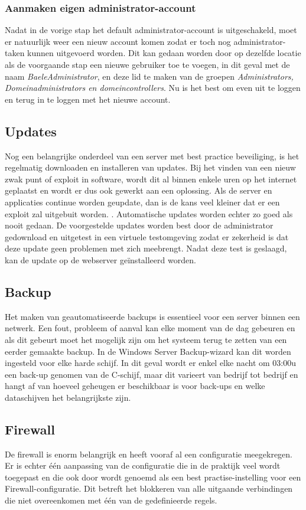 \documentclass[pdftex,a4paper,12pt]{report}
\begin{document}
\subsubsection{Aanmaken eigen administrator-account}
Nadat in de vorige stap het default administrator-account is uitgeschakeld, moet er natuurlijk weer een nieuw account komen zodat er toch nog administrator-taken kunnen uitgevoerd worden. Dit kan gedaan worden door op dezelfde locatie als de voorgaande stap een nieuwe gebruiker toe te voegen, in dit geval met de naam \textit{BaeleAdministrator}, en deze lid te maken van de groepen \textit{Administrators, Domeinadministrators en domeincontrollers}. Nu is het best om even uit te loggen en terug in te loggen met het nieuwe account.

\subsection{Updates}
Nog een belangrijke onderdeel van een server met best practice beveiliging, is het regelmatig downloaden en installeren van updates. Bij het vinden van een nieuw zwak punt of exploit in software, wordt dit al binnen enkele uren op het internet geplaatst en wordt er dus ook gewerkt aan een oplossing. Als de server en applicaties continue worden geupdate, dan is de kans veel kleiner dat er een exploit zal uitgebuit worden. \citep{Cott2012}. Automatische updates worden echter zo goed als nooit gedaan. De voorgestelde updates worden best door de administrator gedownload en uitgetest in een virtuele testomgeving zodat er zekerheid is dat deze update geen problemen met zich meebrengt. Nadat deze test is geslaagd, kan de update op de webserver geïnstalleerd worden.

\subsection{Backup}
Het maken van geautomatiseerde backups is essentieel voor een server binnen een netwerk. Een fout, probleem of aanval kan elke moment van de dag gebeuren en als dit gebeurt moet het mogelijk zijn om het systeem terug te zetten van een eerder gemaakte backup. In de Windows Server Backup-wizard kan dit worden ingesteld voor elke harde schijf. In dit geval wordt er enkel elke nacht om 03:00u een back-up genomen van de C-schijf, maar dit varieert van bedrijf tot bedrijf en hangt af van hoeveel geheugen er beschikbaar is voor back-ups en welke dataschijven het belangrijkste zijn. 

\subsection{Firewall}
De firewall is enorm belangrijk en heeft vooraf al een configuratie meegekregen. Er is echter één aanpassing van de configuratie die in de praktijk veel wordt toegepast en die ook door \cite{Nabors2013} wordt genoemd als een best practise-instelling voor een Firewall-configuratie. Dit betreft het blokkeren van alle uitgaande verbindingen die niet overeenkomen met één van de gedefinieerde regels. \newline 
\end{document}
